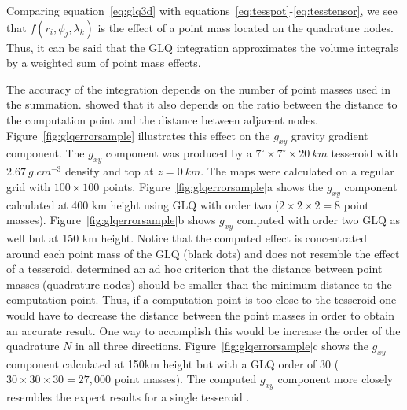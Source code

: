 \documentclass[paper,twocolumn,twoside]{geophysics}
\begin{document}
Comparing equation~\ref{eq:glq3d} with
equations~\ref{eq:tesspot}-\ref{eq:tesstensor},
we see that $f(r_i, \phi_j, \lambda_k)$ is the effect of a point
mass located on the quadrature nodes.
Thus, it can be said that the GLQ integration
approximates the volume integrals  by a
weighted sum of point mass effects.

The accuracy of the integration
depends on the number of point masses used in the summation.
\citet{Ku1977} showed that it also depends on the ratio between
the distance to the computation point and the distance between adjacent nodes.
Figure~\ref{fig:glqerrorsample}
illustrates this effect on the $g_{xy}$ gravity gradient component.
The $g_{xy}$ component was produced by a
$7^\circ \times 7^\circ \times 20\ km$ tesseroid
with $2.67\ g.cm^{-3}$ density
and top at $z=0\ km$.
The maps were calculated on a regular grid
with $100\times100$ points.
Figure~\ref{fig:glqerrorsample}a shows the $g_{xy}$ component
calculated at 400 km height using
GLQ with order two ($2 \times 2 \times 2 = 8$ point masses).
Figure~\ref{fig:glqerrorsample}b shows $g_{xy}$ computed with order two
GLQ as well but at 150 km height.
Notice that the computed effect is concentrated around each point mass
of the GLQ (black dots) and does not resemble the effect of a tesseroid.
\citet{Ku1977} determined an ad hoc criterion that the distance between
point masses (quadrature nodes) should be smaller than the minimum distance to
the computation point.
Thus, if a computation point is too close to the tesseroid one would have to
decrease the distance between the point masses in order to obtain an accurate
result.
One way to accomplish this would be increase the order of the quadrature
$N$ in all three directions.
Figure~\ref{fig:glqerrorsample}c shows the $g_{xy}$ component calculated at
150km height but with a GLQ order of 30
($30 \times 30 \times 30 = 27,000$ point masses).
The computed $g_{xy}$ component more closely resembles
the expect results for a single tesseroid \citep{Asgharzadeh2007}.
\end{document}
